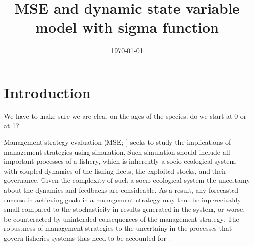 \documentclass[12pt,oneline,a4paper,numbib]{ouparticle}
\numberwithin{equation}{subsection} %
\begin{document}
\title{MSE and dynamic state variable model with sigma function}

\author{%
\address{European Commission, Joint Research Centre (JRC), Sustainable Resources Directorate, Water and Marine Resources Unit, Via Enrico Fermi 2749, 21027 Ispra, Italy.}
\and
{}
\address{Wageningen Marine Research, PO Box 68, 1970 AB IJmuiden, The Netherlands.}
}


\date{\today}


\maketitle


\section{Introduction}
\label{sec1}

We have to make sure we are clear on the ages of the species: do we start at 0 or at 1?

Management strategy evaluation (MSE; \cite{Bunnefeld2011, Sainsbury2000, Smith1994}) seeks to study the implications of management strategies using simulation\cite{Punt2016}. Such simulation should include all important processes of a fishery, which is inherently a socio-ecological system, with coupled dynamics of the fishing fleets, the exploited stocks, and their governance\cite{Punt2016,Rasemeyer2007}. Given the complexity of such a socio-ecological system the uncertainy about the dynamics and feedbacks are consideable. As a result, any forecasted success in achieving goals in a management strategy may thus be inperceivably small compared to the stochasticity in results generated in the system, or worse, be counteracted by unintended consequences of the management strategy. The robustness of management strategies to the uncertainy in the processes that govern fisheries systems thus need to be accounted for \cite{Andersen2010, Kell2007, Prellezo2016, Punt2016}. 
\end{document}
